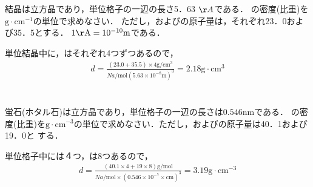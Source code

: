 \documentclass[dvipdfmx]{article}
\begin{document}
  \section{}
    \begin{tcolorbox}[title=問題]
      結晶は立方晶であり，単位格子の一辺の長さ5．63 $\AA$である．
      の密度(比重)を$\mathrm{g \cdot cm^{-1}}$の単位で求めなさい．
      ただし，およびの原子量は，それぞれ23．0および35．5とする． 
      $1 \mathrm{\AA}=10^{-10}\mathrm{m}$である．
    \end{tcolorbox}
    \begin{tcolorbox}[title=解答]
        単位結晶中に，はそれぞれ4つずつあるので，
          \begin{align*}
            d = \frac{(23.0 + 35.5) \times 4 \mathrm{g/cm^3}}{Na \mathrm{/mol} (5.63 \times 10^{-8} \mathrm{m})^3} = 2.18 \mathrm {g \cdot cm^{3}}
          \end{align*}
    \end{tcolorbox}
  \section{}
    \begin{tcolorbox}[title=問題]
      蛍石(ホタル石)は立方晶であり，単位格子の一辺の長さは$0.546 \mathrm{nm}$である．
      の密度(比重)を$\mathrm{g \cdot cm^{-3}}$の単位で求めなさい．ただし，およびの原子量は40．1および19．0と
      する．
    \end{tcolorbox}
    \begin{tcolorbox}[title=解答]
      単位格子中には４つ，は8つあるので，
      \begin{align*}
        d = \frac{(40.1 \times 4 + 19 \times 8) \mathrm{g/mol}}{Na \mathrm{/mol} \times (0.546 \times 10^{-7} \times \mathrm{cm})^3} = 3.19 \mathrm{g \cdot cm^{-3}}
      \end{align*}
    \end{tcolorbox}
\end{document}
